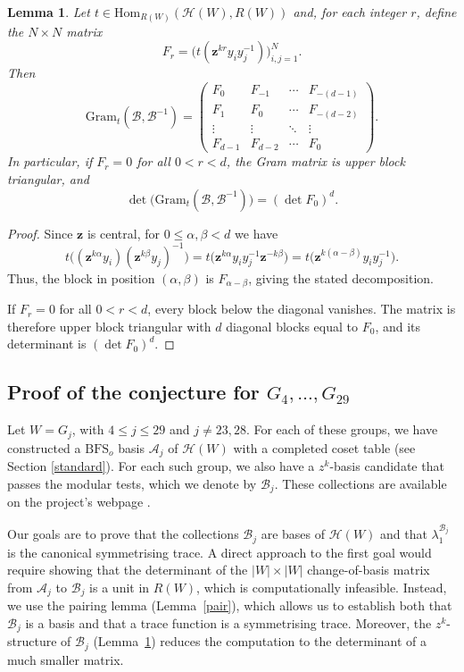 \documentclass[11pt, reqno]{amsart}
\newcommand{\gram}{\mathrm{Gram}}
\newcommand{\cA}{\mathcal{A}}
\newcommand{\cB}{\mathcal{B}}
\newcommand{\cH}{\mathcal{H}}
\newcommand{\Hom}{\mathrm{Hom}}
\newcommand{\BFS}{\mathrm{BFS}}
\numberwithin{equation}{section}
\newtheorem{lemma}[theorem]{Lemma}
\theoremstyle{remark}
\begin{document}
\begin{lemma}\label{gramdec}
	Let $t\in\Hom_{R(W)}(\cH(W),R(W))$ and, for each integer $r$, define the
	$N\times N$ matrix
	\[
	F_r=\big(t(\mathbf z^{kr}y_iy_j^{-1})\big)_{i,j=1}^N.
	\]
	Then
	\[
	\gram_{t}(\cB,\cB^{-1})=
	\begin{pmatrix}
		F_0 & F_{-1} & \cdots & F_{-(d-1)}\\
		F_1 & F_0 & \cdots & F_{-(d-2)}\\
		\vdots & \vdots & \ddots & \vdots\\
		F_{d-1} & F_{d-2} & \cdots & F_0
	\end{pmatrix}.
	\]
	In particular, if $F_r=0$ for all $0<r<d$, the Gram matrix is upper block
	triangular, and
	\[
	\det\bigl(\gram_{t}(\cB,\cB^{-1})\bigr)=(\det F_0)^d.
	\]
\end{lemma}

\begin{proof}
Since $\mathbf z$ is central, for $0\le\alpha,\beta<d$ we have
\[
t\big((\mathbf z^{k\alpha}y_i)(\mathbf z^{k\beta}y_j)^{-1}\big)
=t\big(\mathbf z^{k\alpha}y_iy_j^{-1}\mathbf z^{-k\beta}\big)
=t\big(\mathbf z^{k(\alpha-\beta)}y_iy_j^{-1}\big).
\]
	Thus, the block in position $(\alpha,\beta)$ is $F_{\alpha-\beta}$, giving the stated decomposition.
	
	If $F_r=0$ for all $0<r<d$, every block below the diagonal vanishes. The matrix is
	therefore upper block triangular with $d$ diagonal blocks equal to $F_0$, and its
	determinant is $(\det F_0)^d$.
\end{proof}

\subsection{Proof of the conjecture for $G_4,\dots,G_{29}$}\label{verif}
Let $W=G_j$, with $4\leq j\leq29$ and $j\neq23,28$. For each of these groups, we
have constructed a $\BFS_o$ basis $\cA_j$ of $\cH(W)$ with a completed coset table (see Section \ref{standard}).
 For each such group, we also have a $z^k$-basis candidate that passes
the modular tests, which we denote by $\cB_j$. These collections are available on the project's webpage \cite{web}.


Our goals are to prove that the collections $\cB_j$ are bases of $\cH(W)$ and that $\lambda_1^{\cB_j}$ is the canonical symmetrising trace. A direct approach to the first goal would require showing that the determinant of the $|W|\times|W|$ change-of-basis matrix from $\cA_j$ to $\cB_j$ is a unit in $R(W)$, which is computationally infeasible. Instead, we use the pairing lemma (Lemma~\ref{pair}), which allows us to establish both that $\cB_j$ is a basis and that a  trace function is a symmetrising trace. Moreover, the $z^k$-structure of $\cB_j$ (Lemma~\ref{gramdec}) reduces the computation to the determinant of a much smaller matrix.
\end{document}
